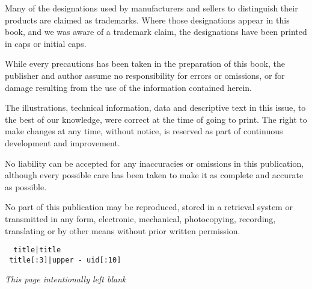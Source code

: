 \documentclass{article}
\begin{document}
\vfill

\noindent
\scriptsize{Many of the designations used by manufacturers and sellers
  to distinguish their products are claimed as trademarks. Where those
  designations appear in this book, and we was aware of a trademark
  claim, the designations have been printed in caps or initial caps.}

\vspace{10pt}

\noindent
\scriptsize{While every precautions has been taken in the preparation of
  this book, the publisher and author assume no responsibility for
  errors or omissions, or for damage resulting from the use of the
  information contained herein.}

\vspace{10pt}

\noindent
\scriptsize{The illustrations, technical information, data and
  descriptive text in this issue, to the best of our knowledge, were
  correct at the time of going to print. The right to make changes at
  any time, without notice, is reserved as part of continuous
  development and improvement.
}

\vspace{10pt}

\noindent
\scriptsize{No liability can be accepted for any inaccuracies or
  omissions in this publication, although every possible care has been
  taken to make it as complete and accurate as possible.}

\vspace{10pt}

\noindent
\scriptsize{No part of this publication may be reproduced, stored in a
  retrieval system or transmitted in any form, electronic, mechanical,
  photocopying, recording, translating or by other means without prior
  written permission.}

\vspace{15pt}

\begin{flushright}
\scriptsize{
  \texttt{ {{ title|title }} \\ {{ title[:3]|upper }}-{{ uid[:10] }} }
}
\end{flushright}



\clearpage

\noindent
\begin{center}
{\normalsize \emph{This page intentionally left blank}}
\end{center}
\end{document}
